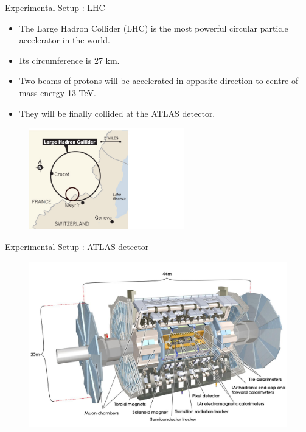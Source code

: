 \documentclass[mathserif,serif]{beamer}
\begin{document}
\begin{frame}{Experimental Setup : LHC}
\begin{itemize}
\item The Large Hadron Collider (LHC) is the most powerful circular particle accelerator in the world.
\item Its circumference is 27 km.
\item Two beams of protons will be accelerated in opposite direction to centre-of-mass energy 13 TeV.
\item They will be finally collided at the ATLAS detector.
\end{itemize}
\begin{figure}
\centering
\includegraphics[width=0.6\textwidth]{data/photo/detector/LHC.jpg}
\end{figure}
\end{frame}

\begin{frame}{Experimental Setup : ATLAS detector}
\begin{figure}
\centering
\includegraphics[width=\textwidth]{data/photo/detector/ATLAS.jpg}
\end{figure}
\end{frame}
\end{document}
